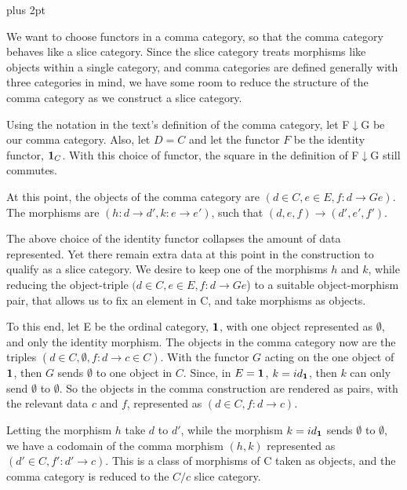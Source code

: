 \documentclass{article}
\def\addpunct#1{%
	\relax\ifhmode
	\ifnum\spacefactor>1000 \else#1\fi
\fi}
\renewenvironment{proof}[1][\proofname]{\par
  \pushQED{\qed}%
  \normalfont \topsep4pt plus 2pt\relax
  \list{}{\leftmargin=1em
          \rightmargin=1em%
          \settowidth{\itemindent}{\itshape#1}%
          \labelwidth=\itemindent
          \parsep=9pt plus3pt minus2pt
		  \listparindent=\parindent 
  }
  \item[\hskip\labelsep
        \itshape
    #1\addpunct{.}]\ignorespaces
}{%
  \popQED\endlist
}
\begin{document}
	\begin{proof}
	
We want to choose functors in a comma category, so that the comma category behaves like a slice category. Since the slice category treats morphisms like objects within a single category, and comma categories are defined generally with three categories in mind, we have some room to reduce the structure of the comma category as we construct a slice category.

Using the notation in the text's definition of the comma category, let F$\downarrow$G be our comma category. Also, let $D = C$ and let the functor $F$ be the identity functor, $\bold 1_C$. With this choice of functor, the square in the definition of F$\downarrow$G still commutes.


At this point, the objects of the comma category are $(d \in C, e\in E, f: d \rightarrow Ge)$. The morphisms are $(h: d\rightarrow d', k: e\rightarrow e')$, such that $(d,e,f) \rightarrow (d',e',f')$. 

The above choice of the identity functor collapses the amount of data represented. Yet there remain extra data at this point in the construction to qualify as a slice category. We desire to keep one of the morphisms $h$ and $k$, while reducing the object-triple $(d \in C, e\in E, f: d \rightarrow Ge$) to a suitable object-morphism pair, that allows us to fix an element in C, and take morphisms as objects.

To this end, let E be the ordinal category, $\bold 1$, with one object represented as $\emptyset$, and only the identity morphism. The objects in the comma category now are the triples $(d \in C, \emptyset, f: d \rightarrow c \in C)$. With the functor $G$ acting on the one object of $\bold 1$, then $G$ sends $\emptyset$ to one object in $C$. Since, in $E = \bold 1$, $k = id_{\bold 1}$, then $k$ can only send $\emptyset$ to $\emptyset$. So the objects in the comma construction are rendered as pairs, with the relevant data $c$ and $f$, represented as $(d \in C, f: d \rightarrow c)$.  

Letting the morphism $h$ take $d$ to $d'$, while the morphism $k = id_{\bold 1}$ sends $\emptyset$ to $\emptyset$, we have a codomain of the comma morphism $(h,k)$ represented as $(d' \in C, f': d' \rightarrow c)$. This is a class of morphisms of C taken as objects, and the comma category is reduced to the $C/c$ slice category.

\end{proof}	
	
	
\end{document}
